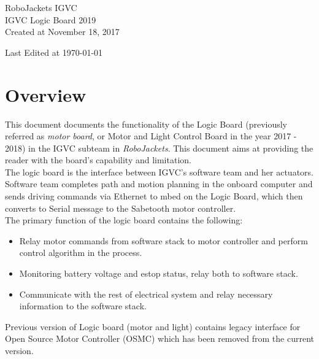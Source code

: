 \documentclass[letterpaper, 12pt]{article}
\newcommand{\cmark}{\ding{51}}%
\newcommand{\done}{\rlap{$\square$}{\raisebox{2pt}{\large\hspace{1pt}\cmark}}%
\hspace{-2.5pt}}
\begin{document}
\begin{titlepage}
\centering
	{\LARGE RoboJackets IGVC}\\
	\vspace{1cm}
	{\Large IGVC Logic Board 2019}\\
	\vfill
	{\large Created at November 18, 2017}\\
	\vspace{1cm}
	{\large Last Edited at \today\par}
\end{titlepage}

\tableofcontents

\pagebreak


\section{Overview}
This document documents the functionality of the Logic Board (previously referred as \emph{motor board},
or Motor and Light Control Board in the year 2017 - 2018) in the IGVC subteam in \emph{RoboJackets}.
This document aims at providing the reader with the board's capability and limitation. \vspace{6pt}\\
The logic board is the interface between IGVC's software team and her actuators. Software team completes
path and motion planning in the onboard computer and sends driving commands via Ethernet to mbed on the Logic
Board, which then converts to Serial message to the Sabetooth motor controller.\\


The primary function of the logic board contains the following:
\begin{itemize}
    \item Relay motor commands from software stack to motor controller and perform control algorithm in the process.
    \item Monitoring battery voltage and estop status, relay both to software stack.
    \item Communicate with the rest of electrical system and relay necessary information to the software stack.
\end{itemize}
Previous version of Logic board (motor and light) contains legacy interface for Open Source Motor Controller (OSMC)
which has been removed from the current version.
\end{document}
